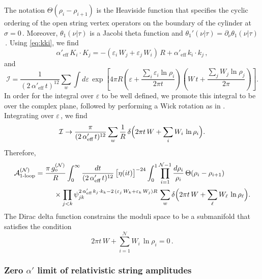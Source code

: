 \documentclass[11pt]{article}
\newcommand{\be}{\begin{equation}}
\newcommand{\ee}{\end{equation}}
\newcommand{\CA}{\mathcal{A}}
\newcommand{\CI}{\mathcal{I}}
\newcommand{\CN}{\mathcal{N}}
\newcommand{\lr}{\left (}
\newcommand{\rr}{\right )}
\newcommand{\ls}{\left [}
\newcommand{\rs}{\right ]}
\newcommand{\p}{\partial}
\begin{document}
%
The notation $\Theta (\rho_i - \rho_{i+1})$ is the Heaviside function that specifies the cyclic ordering of the open string vertex operators on the boundary of the cylinder at $\sigma = 0$\,. Moreover, $\theta_1 (\nu|\tau)$ is a Jacobi theta function and $\theta_1' (\nu|\tau) = \p_\nu \theta_1 (\nu|\tau)$\,.
%
Using \eqref{eq:kki}, we find
%
\be \label{eq:kij}
    \alpha'_\text{eff} \, K_i \cdot K_j = - (\varepsilon_i \, W_j + \varepsilon_j \, W_i) \, R + \alpha'_\text{eff} \, k_i \cdot k_j\,,
\ee
%
and 
%
\be
    \CI = \frac{1}{(2 \, \alpha'_\text{eff} \, t)^{12}} \sum_{w} \int d\varepsilon \, \exp \! \ls 4 \pi R \lr \varepsilon + \frac{\sum_i \varepsilon_i \ln \rho_i}{2\pi t} \rr \lr W \, t + \frac{\sum_j W_j \ln \rho_j}{2 \pi} \rr \rs.
\ee
%
In order for the integral over $\varepsilon$ to be well defined, we promote this integral to be over the complex plane, followed by performing a Wick rotation as in \cite{Bilal:1998vq}. Integrating over $\varepsilon$\,, we find
%
\be \label{eq:inrst}
    \CI \rightarrow \frac{\pi}{(2 \, \alpha'_\text{eff} \, t)^{12}} \sum_w \frac{1}{R} \, \delta \Bigl( 2 \pi t \, W + \sum_i W_i \, \ln \rho_i \Bigr). 
\ee
%
Therefore, 
%
\begin{align} \label{eq:anosol}
\begin{split}
    \CA^{(\CN)}_\text{1-loop} & = \frac{\pi \, g_\text{o}^{(\CN)}}{R}
    \int_0^\infty \frac{dt}{(2 \, \alpha'_\text{eff} \, t)^{12}} \, \bigl[ \eta(it) \bigr]^{-24} \int_0^1 \prod_{i=1}^{\CN-1} \frac{d\rho_i}{\rho_i} \, \Theta(\rho_i - \rho_{i+1}) \\[2pt] 
    & \hspace{.9cm} \times \prod_{j<k} \psi_{jk}^{2 \, \alpha'_\text{eff} \,  k_j \cdot k_k - 2 \, (\varepsilon_j \, W_k + \varepsilon_k \, W_j) R} \, \sum_w \delta \Bigl( 2\pi t \, W + \sum_\ell W_\ell \, \ln \rho_\ell \Bigr).
\end{split}
\end{align}
%
The Dirac delta function constrains the moduli space to be a submanifold that satisfies the condition
%
\be
    2 \pi t \, W + \sum_{i=1}^{\CN} W_i \, \ln \rho_i = 0\,. 
\ee

\subsubsection*{Zero $\alpha'$ limit of relativistic string amplitudes}
\end{document}
